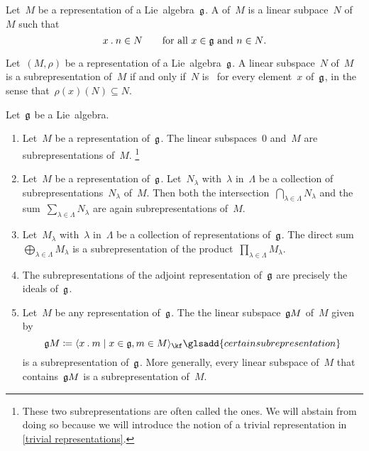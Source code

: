 \begin{definition}
	Let~$M$ be a representation of a Lie~algebra~$\mathfrak{g}$.
	A  of~$M$ is a linear subpace~$N$ of~$M$ such that
	\[
		x \mathbin{.} n \in N
		\qquad
		\text{for all~$x \in \mathfrak{g}$ and~$n \in N$.}
	\]
\end{definition}


\begin{remark}
	Let~$(M, \rho)$ be a representation of a Lie~algebra~$\mathfrak{g}$.
	A linear subspace~$N$ of~$M$ is a subrepresentation of~$M$ if and only if~$N$ is~{} for every element~$x$ of~$\mathfrak{g}$, in the sense that~$\rho(x)(N) \subseteq N$.
\end{remark}


\begin{examples}
	Let~$\mathfrak{g}$ be a Lie~algebra.
	\begin{enumerate}
		\item
			Let~$M$ be a representation of~$\mathfrak{g}$.
			The linear subspaces~$0$ and~$M$ are subrepresentations of~$M$.%
		\footnote{
			These two subrepresentations are often called the  ones.
			We will abstain from doing so because we will introduce the notion of a trivial representation in \cref{trivial representations}.
		}
		\item
			Let~$M$ be a representation of~$\mathfrak{g}$.
			Let~$N_\lambda$ with~$\lambda$ in~$\Lambda$ be a collection of subrepresentations~$N_\lambda$ of~$M$.
			Then both the intersection~$\bigcap_{\lambda \in \Lambda} N_\lambda$ and the sum~$\sum_{\lambda \in \Lambda} N_\lambda$ are again subrepresentations of~$M$.
		\item
			Let~$M_\lambda$ with~$\lambda$ in~$\Lambda$ be a collection of representations of~$\mathfrak{g}$.
			The direct sum~$\bigoplus_{\lambda \in \Lambda} M_\lambda$ is a subrepresentation of the product~$\prod_{\lambda \in \Lambda} M_\lambda$.
		\item
			The subrepresentations of the adjoint representation of~$\mathfrak{g}$ are precisely the ideals of~$\mathfrak{g}$.
		\item
			Let~$M$ be any representation of~$\mathfrak{g}$.
			The the linear subspace~$\mathfrak{g} M$ of~$M$ given by
			\[
				\glie M
				\defined
				\gen{
					x \act m
					\suchthat
					x \in \glie,
					m \in M
				}_{\kf}
				\glsadd{certain subrepresentation}
			\]
			is a subrepresentation of~$\mathfrak{g}$.
			More generally, every linear subspace of~$M$ that contains~$\mathfrak{g} M$ is a subrepresentation of~$M$.
	\end{enumerate}
\end{examples}


